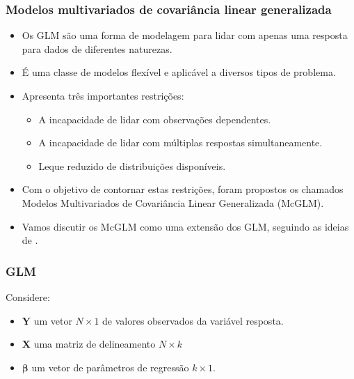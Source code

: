 \documentclass[10pt,
  aspectratio=169,
  serif,
  mathserif,
  professionalfont,
  compress,
  handout,
  ]{beamer}\usepackage[]{graphicx}\usepackage[]{color}
\begin{document}
\begin{frame}
  \frametitle{Modelos multivariados de covariância linear generalizada}
  \begin{itemize}
    \itemsep 2ex
  
  \item Os GLM são uma forma de modelagem para lidar com apenas uma resposta para dados de diferentes naturezas.  
  
  \item É uma classe de modelos flexível e aplicável a diversos tipos de problema.  
  
  \item Apresenta três importantes restrições:
    \begin{itemize}
      \item A incapacidade de lidar com observações dependentes. 
      \item A incapacidade de lidar com múltiplas respostas simultaneamente.
      \item Leque reduzido de distribuições disponíveis. 
    \end{itemize}

  \item Com o objetivo de contornar estas restrições, foram propostos os chamados Modelos Multivariados de Covariância Linear Generalizada (McGLM).
  
  \item Vamos discutir os McGLM como uma extensão dos GLM, seguindo as ideias de \cite{Bonat16} . 
  
  \end{itemize}
\end{frame}


\begin{frame}
  \frametitle{GLM}
  
  Considere:

\begin{itemize}
  \item $\boldsymbol{Y}$ um vetor $N \times 1$ de valores observados da variável resposta.
  
  \item $\boldsymbol{X}$ uma matriz de delineamento $N \times k$
  
  \item $\boldsymbol{\beta}$ um vetor de parâmetros de regressão $k \times 1$. 
\end{itemize}

\end{frame}
\end{document}
